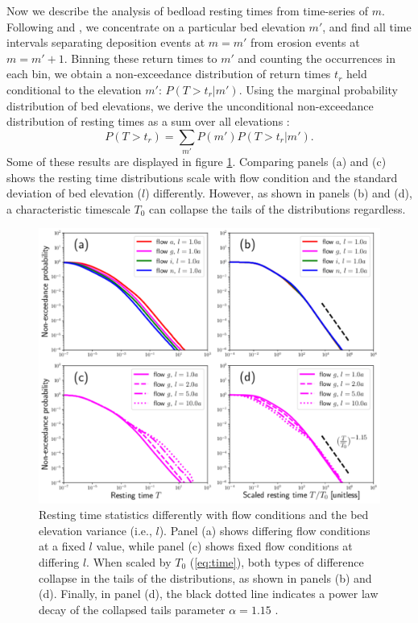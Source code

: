 \documentclass[draft]{agujournal2018}
\newcommand\be{\begin{equation}} %
\newcommand\ee{\end{equation}}   %
\begin{document}
Now we describe the analysis of bedload resting times from time-series of $m$.
Following \citet{Voepel2013} and \citet{Martin2014}, we concentrate on a particular bed elevation $m'$, and find all time intervals separating deposition events at $m=m'$ from erosion events at $m=m'+1$.
Binning these return times to $m'$ and counting the occurrences in each bin, we obtain a non-exceedance distribution of return times $t_r$ held conditional to the elevation $m'$: $P(T>t_r|m')$.
Using the marginal probability distribution of bed elevations, we derive the unconditional non-exceedance distribution of resting times as a sum over all elevations \citep{Yang1971, Nakagawa1980, Voepel2013, Martin2014}:
\be P(T>t_r) = \sum_{m'} P(m') P(T>t_r|m') .\ee
Some of these results are displayed in figure \ref{fig:cdfs}.
Comparing panels (a) and (c) shows the resting time distributions scale with flow condition and the standard deviation of bed elevation ($l$) differently.
However, as shown in panels (b) and (d), a characteristic timescale $T_0$ can collapse the tails of the distributions regardless.
\begin{figure}[t!]
	\includegraphics[width=\linewidth,keepaspectratio]{./figures/montage1.pdf}
	\caption{Resting time statistics differently with flow conditions and the bed elevation variance (i.e., $l$). Panel (a) shows differing flow conditions at a fixed $l$ value, while panel (c) shows fixed flow conditions at differing $l$. When scaled by $T_0$ (\ref{eq:time}), both types of difference collapse in the tails of the distributions, as shown in panels (b) and (d). Finally, in panel (d), the black dotted line indicates a power law decay of the collapsed tails parameter $\alpha=1.15$ .}
	\label{fig:cdfs}
\end{figure}
\end{document}
